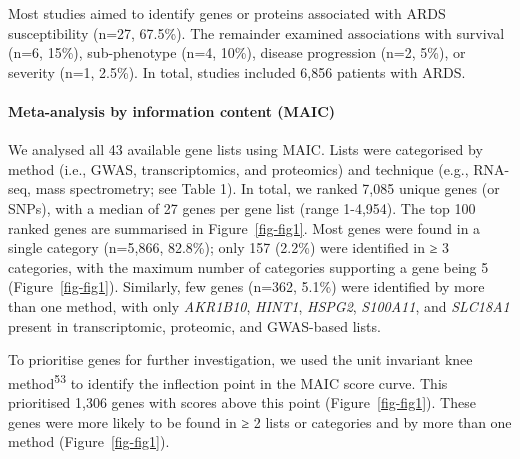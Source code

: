 \documentclass[
  11,
  a4paper,
]{article}
\let\oldparagraph\paragraph
\renewcommand{\paragraph}[1]{\oldparagraph{#1}\mbox{}}
\begin{document}
Most studies aimed to identify genes or proteins associated with ARDS
susceptibility (n=27, 67.5\%). The remainder examined associations with
survival (n=6, 15\%), sub-phenotype (n=4, 10\%), disease progression
(n=2, 5\%), or severity (n=1, 2.5\%). In total, studies included 6,856
patients with ARDS.

\paragraph{Meta-analysis by information content
(MAIC)}\label{meta-analysis-by-information-content-maic}

We analysed all 43 available gene lists using MAIC. Lists were
categorised by method (i.e., GWAS, transcriptomics, and proteomics) and
technique (e.g., RNA-seq, mass spectrometry; see Table 1). In total, we
ranked 7,085 unique genes (or SNPs), with a median of 27 genes per gene
list (range 1-4,954). The top 100 ranked genes are summarised in
Figure~\ref{fig-fig1}. Most genes were found in a single category
(n=5,866, 82.8\%); only 157 (2.2\%) were identified in ≥ 3 categories,
with the maximum number of categories supporting a gene being 5
(Figure~\ref{fig-fig1}). Similarly, few genes (n=362, 5.1\%) were
identified by more than one method, with only \emph{AKR1B10},
\emph{HINT1}, \emph{HSPG2}, \emph{S100A11}, and \emph{SLC18A1} present
in transcriptomic, proteomic, and GWAS-based lists.

To prioritise genes for further investigation, we used the unit
invariant knee method\textsuperscript{53} to identify the inflection
point in the MAIC score curve. This prioritised 1,306 genes with scores
above this point (Figure~\ref{fig-fig1}). These genes were more likely
to be found in ≥ 2 lists or categories and by more than one method
(Figure~\ref{fig-fig1}).
\end{document}
